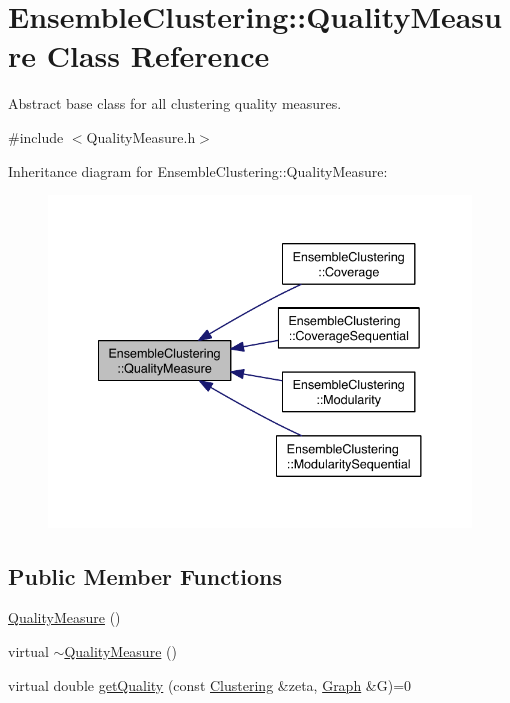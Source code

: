 \hypertarget{class_ensemble_clustering_1_1_quality_measure}{\section{Ensemble\-Clustering\-:\-:Quality\-Measure Class Reference}
\label{class_ensemble_clustering_1_1_quality_measure}
}


Abstract base class for all clustering quality measures.  




{\ttfamily \#include $<$Quality\-Measure.\-h$>$}



Inheritance diagram for Ensemble\-Clustering\-:\-:Quality\-Measure\-:
\nopagebreak
\begin{figure}[H]
\begin{center}
\leavevmode
\includegraphics[width=338pt]{class_ensemble_clustering_1_1_quality_measure__inherit__graph}
\end{center}
\end{figure}
\subsection*{Public Member Functions}
\begin{DoxyCompactItemize}
\item 
\hyperlink{class_ensemble_clustering_1_1_quality_measure_ac5883974a45eee1955431cb82048fee2}{Quality\-Measure} ()
\item 
virtual \hyperlink{class_ensemble_clustering_1_1_quality_measure_aa7c9e45c6605f81f63c6dcca105e964c}{$\sim$\-Quality\-Measure} ()
\item 
virtual double \hyperlink{class_ensemble_clustering_1_1_quality_measure_aadeac7e03b1fa099669d3b1e93edd1e9}{get\-Quality} (const \hyperlink{class_ensemble_clustering_1_1_clustering}{Clustering} \&zeta, \hyperlink{class_ensemble_clustering_1_1_graph}{Graph} \&G)=0
\end{DoxyCompactItemize}


